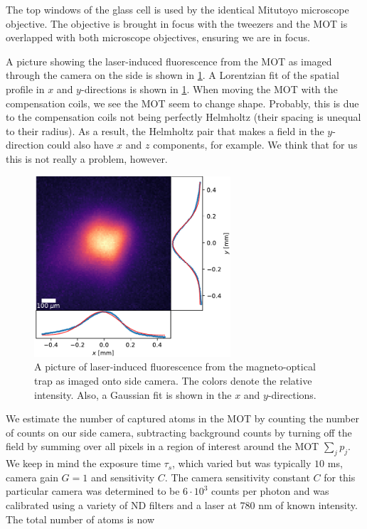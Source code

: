 The top windows of the glass cell is used by the identical Mitutoyo microscope objective. 
The objective is brought in focus with the tweezers and the MOT is overlapped with both microscope objectives, ensuring we are in focus.


A picture showing the laser-induced fluorescence from the MOT as imaged through the camera on the side is shown in \cref{fig:LiF}.
A Lorentzian fit of the spatial profile in $x$ and $y$-directions is shown in \cref{fig:LiF}.
When moving the MOT with the compensation coils, we see the MOT seem to change shape. 
Probably, this is due to the compensation coils not being perfectly Helmholtz (their spacing is unequal to their radius). 
As a result, the Helmholtz pair that makes a field in the $y$-direction could also have $x$ and $z$ components, for example. We think that for us this is not really a problem, however.

\begin{figure}
    \centering
    \includegraphics[width=0.65\textwidth]{figures/FluoresenceAndFits.pdf}
    \caption{A picture of laser-induced fluorescence from the magneto-optical trap as imaged onto side camera. 
    The colors denote the relative intensity.
    Also, a Gaussian fit is shown in the $x$ and $y$-directions.}
    \label{fig:LiF}
\end{figure}

   
We estimate the number of captured atoms in the MOT by counting the number of counts on our side camera, subtracting background counts by turning off the field by summing over all pixels in a region of interest around the MOT $\sum_j p_j$.
We keep in mind the exposure time $\tau_s$, which varied but was typically $10$ ms, camera gain $G = 1$ and sensitivity $C$.
The camera sensitivity constant $C$ for this particular camera was determined to be $6 \cdot 10^3$ counts per photon and was calibrated using a variety of ND filters and a laser at 780 nm of known intensity. The total number of atoms is now
 
